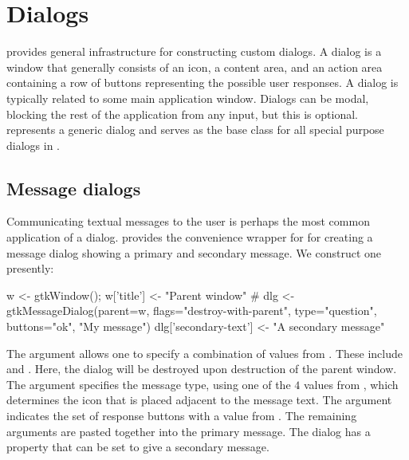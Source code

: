 \section{Dialogs}
\label{sec:dialogs}


\GTK\/ provides general infrastructure for constructing custom
dialogs.  A dialog is a window that generally consists of an icon, a
content area, and an action area containing a row of buttons
representing the possible user responses.  A dialog is typically
related to some main application window. Dialogs can be modal,
blocking the rest of the application from any input, but this is
optional.   represents a generic dialog and serves as
the base class for all special purpose dialogs in \GTK.

\subsection{Message dialogs}

Communicating textual messages to the user is perhaps the most common
application of a dialog. \GTK\/ provides the
 convenience wrapper for
 for creating a message dialog showing a primary and
secondary message.  We construct one presently:
\begin{Schunk}
\begin{Sinput}
 w <- gtkWindow(); w['title'] <- "Parent window"
 #
 dlg <- gtkMessageDialog(parent=w, 
                         flags="destroy-with-parent",
                         type="question", 
                         buttons="ok",
                         "My message")
 dlg['secondary-text'] <- "A secondary message"
\end{Sinput}
\end{Schunk}
%

The  argument allows one to specify
a combination of values from . These include 
 and . Here, the dialog will be
destroyed upon destruction of the parent window. The
 argument specifies the message type,
using one of the $4$ values from , which determines the icon that
is placed adjacent to the message text. The
 argument indicates the set of
response buttons with a value from . The
remaining arguments are pasted together into the primary message.  The
dialog has a  property that can be set to give a
secondary message.

